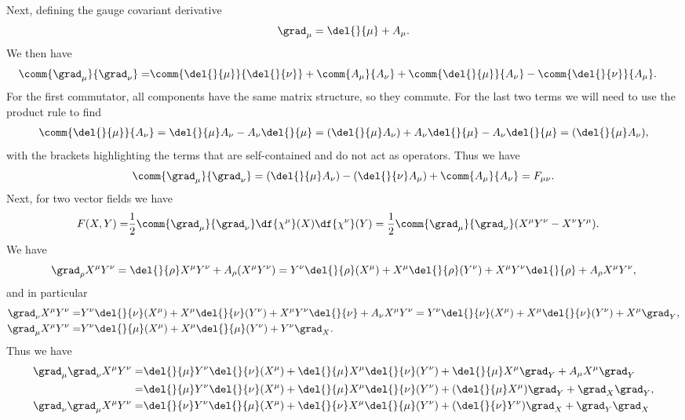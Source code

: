 Next, defining the gauge covariant derivative
\begin{align*}
	\grad_{\mu} = \del{}{\mu} + A_{\mu}.
\end{align*}
We then have
\begin{align*}
	\comm{\grad_{\mu}}{\grad_{\nu}} =& \comm{\del{}{\mu}}{\del{}{\nu}} + \comm{A_{\mu}}{A_{\nu}} + \comm{\del{}{\mu}}{A_{\nu}} - \comm{\del{}{\nu}}{A_{\mu}}.
\end{align*}
For the first commutator, all components have the same matrix structure, so they commute. For the last two terms we will need to use the product rule to find
\begin{align*}
	\comm{\del{}{\mu}}{A_{\nu}} = \del{}{\mu}A_{\nu} - A_{\nu}\del{}{\mu} = (\del{}{\mu}A_{\nu}) + A_{\nu}\del{}{\mu} - A_{\nu}\del{}{\mu} = (\del{}{\mu}A_{\nu}),
\end{align*}
with the brackets highlighting the terms that are self-contained and do not act as operators. Thus we have
\begin{align*}
	\comm{\grad_{\mu}}{\grad_{\nu}} = (\del{}{\mu}A_{\nu}) - (\del{}{\nu}A_{\mu}) + \comm{A_{\mu}}{A_{\nu}} = F_{\mu\nu}.
\end{align*}
Next, for two vector fields we have
\begin{align*}
	F(X, Y) =& \frac{1}{2}\comm{\grad_{\mu}}{\grad_{\nu}}\df{\chi^{\mu}}(X)\df{\chi^{\nu}}(Y) = \frac{1}{2}\comm{\grad_{\mu}}{\grad_{\nu}}(X^{\mu}Y^{\nu} - X^{\nu}Y^{\mu}).
\end{align*}
We have
\begin{align*}
	\grad_{\rho}X^{\mu}Y^{\nu} = \del{}{\rho}X^{\mu}Y^{\nu} + A_{\rho}(X^{\mu}Y^{\nu}) = Y^{\nu}\del{}{\rho}(X^{\mu}) + X^{\mu}\del{}{\rho}(Y^{\nu}) + X^{\mu}Y^{\nu}\del{}{\rho} + A_{\rho}X^{\mu}Y^{\nu},
\end{align*}
and in particular
\begin{align*}
	\grad_{\nu}X^{\mu}Y^{\nu} =& Y^{\nu}\del{}{\nu}(X^{\mu}) + X^{\mu}\del{}{\nu}(Y^{\nu}) + X^{\mu}Y^{\nu}\del{}{\nu} + A_{\nu}X^{\mu}Y^{\nu} = Y^{\nu}\del{}{\nu}(X^{\mu}) + X^{\mu}\del{}{\nu}(Y^{\nu}) + X^{\mu}\grad_{Y}, \\
	\grad_{\mu}X^{\mu}Y^{\nu} =& Y^{\nu}\del{}{\mu}(X^{\mu}) + X^{\mu}\del{}{\mu}(Y^{\nu}) + Y^{\nu}\grad_{X}.
\end{align*}
Thus we have
\begin{align*}
	\grad_{\mu}\grad_{\nu}X^{\mu}Y^{\nu} =& \del{}{\mu}Y^{\nu}\del{}{\nu}(X^{\mu}) + \del{}{\mu}X^{\mu}\del{}{\nu}(Y^{\nu}) + \del{}{\mu}X^{\mu}\grad_{Y} + A_{\mu}X^{\mu}\grad_{Y} \\
	=& \del{}{\mu}Y^{\nu}\del{}{\nu}(X^{\mu}) + \del{}{\mu}X^{\mu}\del{}{\nu}(Y^{\nu}) + (\del{}{\mu}X^{\mu})\grad_{Y} + \grad_{X}\grad_{Y}, \\
	\grad_{\nu}\grad_{\mu}X^{\mu}Y^{\nu} =& \del{}{\nu}Y^{\nu}\del{}{\mu}(X^{\mu}) + \del{}{\nu}X^{\mu}\del{}{\mu}(Y^{\nu}) + (\del{}{\nu}Y^{\nu})\grad_{X} + \grad_{Y}\grad_{X}
\end{align*}

